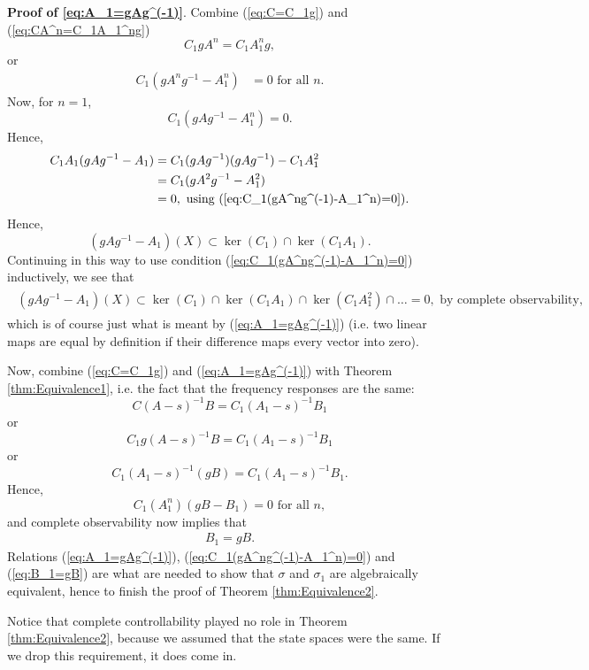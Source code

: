\documentclass[12pt]{book}
\theoremstyle{plain}
\theoremstyle{definition}
\begin{document}
\textbf{Proof of \ref{eq:A_1=gAg^(-1)}}.
Combine (\ref{eq:C=C_1g}) and (\ref{eq:CA^n=C_1A_1^ng})
$$C_1gA^n = C_1A_1^ng,$$
or
\begin{align} \label{eq:C_1(gA^ng^(-1)-A_1^n)=0}
    C_1(gA^ng^{-1}-A_1^n) &= 0 \text{ for all } n.
\end{align}
Now, for $n = 1$,
$$C_1(gAg^{-1} - A_1^n) = 0.$$
Hence,
\begin{align*}
    C_1A_1(gAg^{-1}-A_1) &= C_1(gAg^{-1})(gAg^{-1}) - C_1A_1^2 \\
    &= C_1(gA^2g^{-1} - A_1^2) \\
    &= 0, \text{ using } (\ref{eq:C_1(gA^ng^(-1)-A_1^n)=0}).
\end{align*}
Hence,
$$(gAg^{-1}-A_1)(X) \subset \ker(C_1) \cap \ker(C_1A_1).$$
Continuing in this way to use condition (\ref{eq:C_1(gA^ng^(-1)-A_1^n)=0}) inductively, we see that
\begin{align*}
\begin{split}
    (gAg^{-1}-A_1)(X) \subset \ker(C_1) \cap \ker(C_1A_1) \cap \ker(C_1A_1^2) \cap \dots = 0, \text{ by complete observability},
\end{split}
\end{align*}
which is of course just what is meant by (\ref{eq:A_1=gAg^(-1)}) (i.e. two linear maps are equal by definition if their difference maps every vector into zero).

Now, combine (\ref{eq:C=C_1g}) and (\ref{eq:A_1=gAg^(-1)}) with Theorem \ref{thm:Equivalence1}, i.e. the fact that the frequency responses are the same:
$$C(A-s)^{-1}B = C_1(A_1-s)^{-1}B_1$$
or
$$C_1g(A-s)^{-1}B = C_1(A_1-s)^{-1}B_1$$
or
$$C_1(A_1-s)^{-1}(gB) = C_1(A_1-s)^{-1}B_1.$$
Hence,
$$C_1(A_1^n)(gB-B_1) = 0 \text{ for all } n,$$
and complete observability now implies that
\begin{align} \label{eq:B_1=gB}
    B_1 = gB.
\end{align}
Relations (\ref{eq:A_1=gAg^(-1)}), (\ref{eq:C_1(gA^ng^(-1)-A_1^n)=0}) and (\ref{eq:B_1=gB}) are what are needed to show that $\sigma$ and $\sigma_1$ are algebraically equivalent, hence to finish the proof of Theorem \ref{thm:Equivalence2}.

Notice that complete controllability played no role in Theorem \ref{thm:Equivalence2}, because we assumed that the state spaces were the same.
If we drop this requirement, it does come in.
\end{document}
